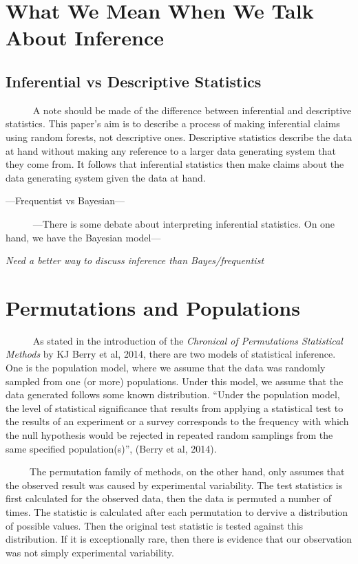 \documentclass[12pt,twoside]{reedthesis}
\begin{document}
  \section{What We Mean When We Talk About
  Inference}\label{what-we-mean-when-we-talk-about-inference}
  
  \subsection{Inferential vs Descriptive
  Statistics}\label{inferential-vs-descriptive-statistics}
  
  ~~~~~ A note should be made of the difference between inferential and
  descriptive statistics. This paper's aim is to describe a process of
  making inferential claims using random forests, not descriptive ones.
  Descriptive statistics describe the data at hand without making any
  reference to a larger data generating system that they come from. It
  follows that inferential statistics then make claims about the data
  generating system given the data at hand.
  
  ---Frequentist vs Bayesian---
  
  ~~~~~ ---There is some debate about interpreting inferential statistics.
  On one hand, we have the Bayesian model---
  
  \emph{Need a better way to discuss inference than Bayes/frequentist}
  
  \section{Permutations and
  Populations}\label{permutations-and-populations}
  
  ~~~~~ As stated in the introduction of the \emph{Chronical of
  Permutations Statistical Methods} by KJ Berry et al, 2014, there are two
  models of statistical inference. One is the population model, where we
  assume that the data was randomly sampled from one (or more)
  populations. Under this model, we assume that the data generated follows
  some known distribution. ``Under the population model, the level of
  statistical significance that results from applying a statistical test
  to the results of an experiment or a survey corresponds to the frequency
  with which the null hypothesis would be rejected in repeated random
  samplings from the same specified population(s)'', (Berry et al, 2014).
  
  ~~~~~The permutation family of methods, on the other hand, only assumes
  that the observed result was caused by experimental variability. The
  test statistics is first calculated for the observed data, then the data
  is permuted a number of times. The statistic is calculated after each
  permutation to dervive a distribution of possible values. Then the
  original test statistic is tested against this distribution. If it is
  exceptionally rare, then there is evidence that our observation was not
  simply experimental variability.
  
\end{document}
